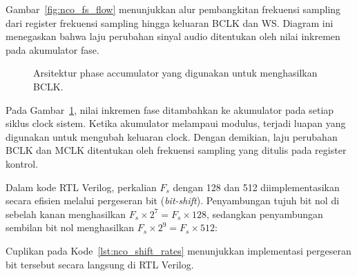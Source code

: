 Gambar~\ref{fig:nco_fs_flow} menunjukkan alur pembangkitan frekuensi sampling dari register frekuensi sampling hingga keluaran BCLK dan WS. Diagram ini menegaskan bahwa laju perubahan sinyal audio ditentukan oleh nilai inkremen pada akumulator fase.

\begin{figure}[H]
	\centering
	\caption{Arsitektur phase accumulator yang digunakan untuk menghasilkan BCLK.}
	\label{fig:nco_architecture}
\end{figure}

\FloatBarrier

Pada Gambar~\ref{fig:nco_architecture}, nilai inkremen fase ditambahkan ke akumulator pada setiap siklus clock sistem. Ketika akumulator melampaui modulus, terjadi luapan yang digunakan untuk mengubah keluaran clock. Dengan demikian, laju perubahan BCLK dan MCLK ditentukan oleh frekuensi sampling yang ditulis pada register kontrol.

Dalam kode RTL Verilog, perkalian $F_s$ dengan 128 dan 512 diimplementasikan secara efisien melalui pergeseran bit (\textit{bit-shift}). Penyambungan tujuh bit nol di sebelah kanan menghasilkan $F_s \times 2^7 = F_s \times 128$, sedangkan penyambungan sembilan bit nol menghasilkan $F_s \times 2^9 = F_s \times 512$:

Cuplikan pada Kode~\ref{lst:nco_shift_rates} menunjukkan implementasi pergeseran bit tersebut secara langsung di RTL Verilog.

